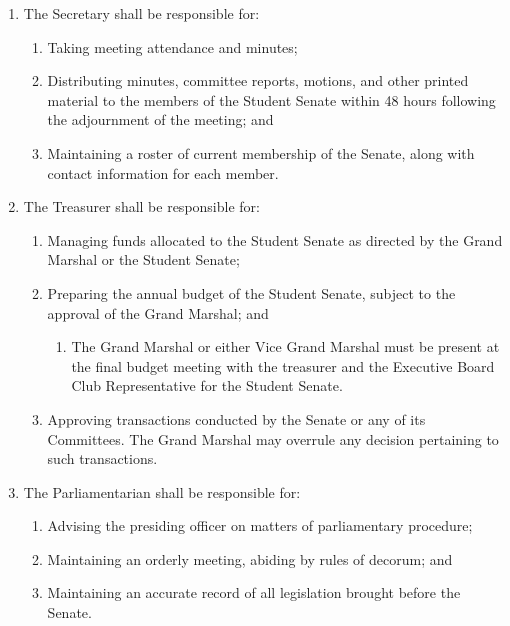 \documentclass{uniondoc}
\begin{document}
\begin{enumerate}
\begin{enumerate}
		      \item Ensuring engagement among Senators and continuity between terms of the Senate.
	      \end{enumerate}
	\item The Secretary shall be responsible for:
	      \begin{enumerate}
		      \item Taking meeting attendance and minutes;
		      \item Distributing minutes, committee reports, motions, and other printed material to the members of the Student Senate within 48 hours following the adjournment of the meeting; and
		      \item Maintaining a roster of current membership of the Senate, along with contact information for each member.
	      \end{enumerate}
	\item The Treasurer shall be responsible for:
	      \begin{enumerate}
		      \item Managing funds allocated to the Student Senate as directed by the Grand Marshal or the Student Senate;
		      \item Preparing the annual budget of the Student Senate, subject to the approval of the Grand Marshal; and
		            \begin{enumerate}
			            \item The Grand Marshal or either Vice Grand Marshal must be present at the final budget meeting with the treasurer and the Executive Board Club Representative for the Student Senate.
		            \end{enumerate}
		      \item Approving transactions conducted by the Senate or any of its Committees.
		            The Grand Marshal may overrule any decision pertaining to such transactions.
	      \end{enumerate}
	\item The Parliamentarian shall be responsible for:
	      \begin{enumerate}
		      \item Advising the presiding officer on matters of parliamentary procedure;
		      \item Maintaining an orderly meeting, abiding by rules of decorum; and
		      \item Maintaining an accurate record of all legislation brought before the Senate.
	      \end{enumerate}

\end{enumerate}
\end{document}
